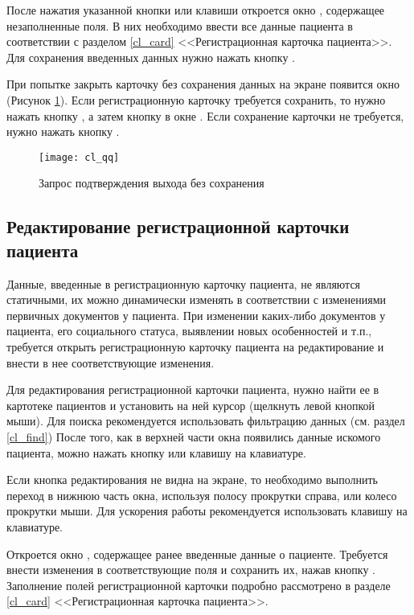 После нажатия указанной кнопки или клавиши откроется окно , содержащее незаполненные поля. В них необходимо ввести все данные пациента в соответствии с разделом \ref{cl_card} <<Регистрационная карточка пациента>>. Для сохранения введенных данных нужно нажать кнопку .

При попытке закрыть карточку без сохранения данных на экране появится окно (Рисунок \ref{img_cl_qq}). Если регистрационную карточку требуется сохранить, то нужно нажать кнопку  , а затем кнопку   в окне . Если сохранение карточки не требуется, нужно нажать кнопку .

\begin{figure}[ht]\centering
 \texttt{[image: cl\_qq]}
 \caption{Запрос подтверждения выхода без сохранения}
 \label{img_cl_qq}
\end{figure} 

\subsection{Редактирование регистрационной карточки пациента}

Данные, введенные в регистрационную карточку пациента, не являются статичными, их можно динамически изменять в соответствии с изменениями первичных документов у пациента. При изменении каких-либо документов у пациента, его социального статуса, выявлении новых особенностей и т.п., требуется открыть регистрационную карточку пациента на редактирование и внести в нее соответствующие изменения. 

Для редактирования регистрационной карточки пациента, нужно найти ее в картотеке пациентов и установить на ней курсор (щелкнуть левой кнопкой мыши). Для поиска рекомендуется использовать фильтрацию данных (см. раздел \ref{cl_find}) После того, как в верхней части окна появились данные искомого пациента, можно нажать кнопку   или клавишу  на клавиатуре.

\begin{vnim}
Если кнопка редактирования не видна на экране, то необходимо выполнить переход в нижнюю часть окна, используя полосу прокрутки справа, или колесо прокрутки мыши. Для ускорения работы рекомендуется использовать клавишу  на клавиатуре.
\end{vnim}
 
Откроется окно , содержащее ранее введенные данные о пациенте. Требуется внести изменения в соответствующие поля и сохранить их, нажав кнопку . Заполнение полей регистрационной карточки подробно рассмотрено в разделе \ref{cl_card} <<Регистрационная карточка пациента>>.

